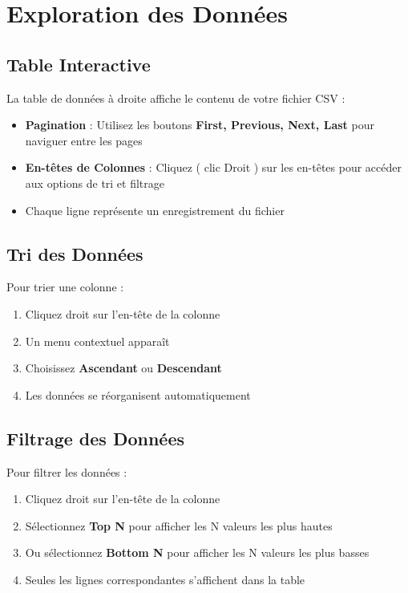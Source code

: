 \documentclass[11pt, a4paper]{article}
\begin{document}
\section{Exploration des Données}

\subsection{Table Interactive}
La table de données à droite affiche le contenu de votre fichier CSV :

\begin{itemize}
    \item \textbf{Pagination} : Utilisez les boutons \textbf{First, Previous, Next, Last} pour naviguer entre les pages
    \item \textbf{En-têtes de Colonnes} : Cliquez ( clic Droit ) sur les en-têtes pour accéder aux options de tri et filtrage
    \item Chaque ligne représente un enregistrement du fichier
\end{itemize}

\subsection{Tri des Données}
Pour trier une colonne :

\begin{enumerate}
    \item Cliquez droit sur l'en-tête de la colonne
    \item Un menu contextuel apparaît
    \item Choisissez \textbf{Ascendant} ou \textbf{Descendant}
    \item Les données se réorganisent automatiquement
\end{enumerate}

\subsection{Filtrage des Données}
Pour filtrer les données :

\begin{enumerate}
    \item Cliquez droit sur l'en-tête de la colonne
    \item Sélectionnez \textbf{Top N} pour afficher les N valeurs les plus hautes
    \item Ou sélectionnez \textbf{Bottom N} pour afficher les N valeurs les plus basses
    \item Seules les lignes correspondantes s'affichent dans la table
\end{enumerate}
\end{document}
